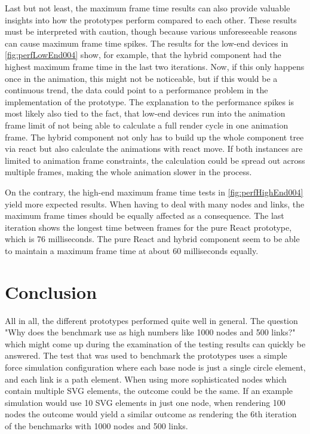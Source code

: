 Last but not least, the maximum frame time results can also provide valuable insights into how the prototypes perform compared to each other. These results must be interpreted with caution, though because various unforeseeable reasons can cause maximum frame time spikes. The results for the low-end devices in \ref{fig:perfLowEnd004} show, for example, that the hybrid component had the highest maximum frame time in the last two iterations. Now, if this only happens once in the animation, this might not be noticeable, but if this would be a continuous trend, the data could point to a performance problem in the implementation of the prototype. The explanation to the performance spikes is most likely also tied to the fact, that low-end devices run into the animation frame limit of not being able to calculate a full render cycle in one animation frame. The hybrid component not only has to build up the whole component tree via react but also calculate the animations with react move. If both instances are limited to animation frame constraints, the calculation could be spread out across multiple frames, making the whole animation slower in the process.

On the contrary, the high-end maximum frame time tests in \ref{fig:perfHighEnd004} yield more expected results. When having to deal with many nodes and links, the maximum frame times should be equally affected as a consequence. The last iteration shows the longest time between frames for the pure React prototype, which is 76 milliseconds. The pure React and hybrid component seem to be able to maintain a maximum frame time at about 60 milliseconds equally.


\section{Conclusion}

All in all, the different prototypes performed quite well in general. The question "Why does the benchmark use as high numbers like 1000 nodes and 500 links?" which might come up during the examination of the testing results can quickly be answered. The test that was used to benchmark the prototypes uses a simple force simulation configuration where each base node is just a single circle element, and each link is a path element. When using more sophisticated nodes which contain multiple SVG elements, the outcome could be the same. If an example simulation would use 10 SVG elements in just one node, when rendering 100 nodes the outcome would yield a similar outcome as rendering the 6th iteration of the benchmarks with 1000 nodes and 500 links.

